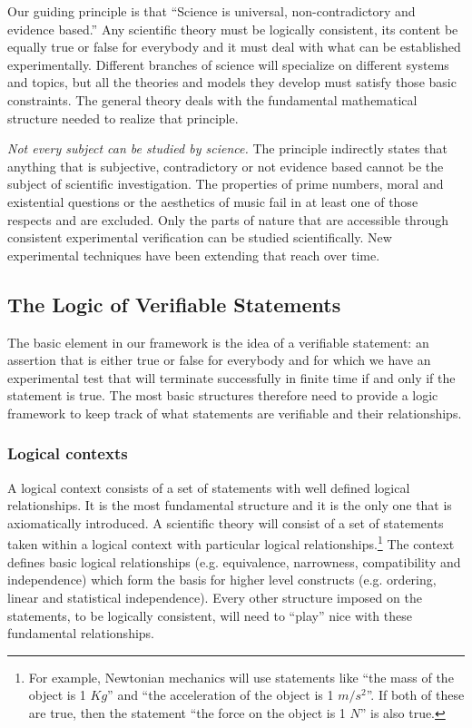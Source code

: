 \documentclass[twocolumn]{article}
\begin{document}
Our guiding principle is that ``Science is universal, non-contradictory and evidence based.'' Any scientific theory must be logically consistent, its content be equally true or false for everybody and it must deal with what can be established experimentally. Different branches of science will specialize on different systems and topics, but all the theories and models they develop must satisfy those basic constraints. The general theory deals with the fundamental mathematical structure needed to realize that principle. 

\emph{Not every subject can be studied by science.} The principle indirectly states that anything that is subjective, contradictory or not evidence based cannot be the subject of scientific investigation. The properties of prime numbers, moral and existential questions or the aesthetics of music fail in at least one of those respects and are excluded. Only the parts of nature that are accessible through consistent experimental verification can be studied scientifically. New experimental techniques have been extending that reach over time.

\subsection{The Logic of Verifiable Statements}

The basic element in our framework is the idea of a verifiable statement: an assertion that is either true or false for everybody and for which we have an experimental test that will terminate successfully in finite time if and only if the statement is true. The most basic structures therefore need to provide a logic framework to keep track of what statements are verifiable and their relationships.

\subsubsection{Logical contexts}

A logical context consists of a set of statements with well defined logical relationships. It is the most fundamental structure and it is the only one that is axiomatically introduced.  A scientific theory will consist of a set of statements taken within a logical context with particular logical relationships.\footnote{For example, Newtonian mechanics will use statements like ``the mass of the object is 1 $Kg$'' and ``the acceleration of the object is 1 $m/s^2$''. If both of these are true, then the statement ``the force on the object is  1 $N$'' is also true.} The context defines basic logical relationships (e.g. equivalence, narrowness, compatibility and independence) which form the basis for higher level constructs (e.g. ordering, linear and statistical independence). Every other structure imposed on the statements, to be logically consistent, will need to ``play'' nice with these fundamental relationships.
\end{document}
